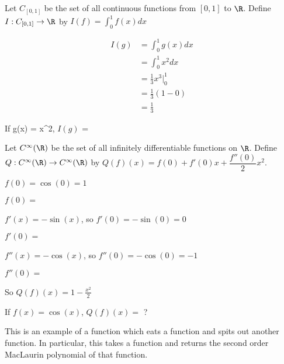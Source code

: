 \begin{question}
Let $C_{[0,1]}$ be the set of all continuous functions from $[0,1]$ to $\R$.  Define $I:C_{[0,1]} \to \R$ by $I(f) = \displaystyle \int_0^1 f(x)dx$ 
	\begin{solution}
		\begin{hint}
			\begin{align*}
				I(g) &= \int_0^1 g(x)dx\\
				&= \int_0^1 x^2dx\\
				&= \frac{1}{3} x^3\big|_0^1\\
				&= \frac{1}{3}(1-0)\\
				&= \frac{1}{3}
			\end{align*}
		\end{hint}
		
		If g(x)  = x^2,  $I(g)$ = 
	\end{solution}
\end{question}

\begin{question}
Let $C^{\infty}(\R)$ be the set of all infinitely differentiable functions on $\R$.  Define $Q: C^{\infty}(\R) \to C^{\infty}(\R)$ by $Q(f)(x) = f(0)+f'(0)x+\dfrac{f''(0)}{2}x^2$.
\begin{solution}
\begin{hint}
	\begin{question}
		\begin{solution}
			\begin{hint}
				$f(0)=\cos(0)=1$
			\end{hint}
			$f(0) = $ \answer{1}
		\end{solution}
	\end{question}
	\begin{question}
		\begin{solution}
			\begin{hint}
				$f'(x) = -\sin(x)$, so $f'(0)=-\sin(0)=0$
			\end{hint}
			$f'(0) = $ \answer{0}
		\end{solution}
	 \end{question}
	 \begin{question}
		\begin{solution}
			\begin{hint}
				$f''(x) = -\cos(x)$, so $f''(0)=-\cos(0)=-1$
			\end{hint}
			$f''(0) = $ \answer{-1}
		\end{solution}
	 \end{question}
\end{hint}
\begin{hint}
	So $Q(f)(x) = 1-\frac{x^2}{2}$
\end{hint}
If $f(x) = \cos(x)$, $Q(f)(x)=$ ?
\end{solution}
This is an example of a function which eats a function and spits out another function. In particular, this takes a function and 
returns the second order MacLaurin polynomial of that function.
\end{question}

